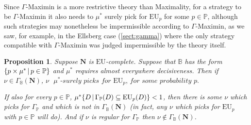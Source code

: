 \documentclass[a4paper]{article}
\newtheorem{proposition}[theorem]{Proposition}
\newcommand\N{\mathbf{N}}
\renewcommand\S{\mathcal{S}}
\renewcommand\P{\mathbb{P}} %
\newcommand\EU{\mathrm{EU}}
\newcommand\Maximin{\Gamma}
\newcommand{\IB}{\mathbb{B}}
\newcommand{\IP}{\P}
\renewcommand{\color}[1]{}
\newcommand\SetDelimiter[1][]{
	\nonscript\,#1\vert \allowbreak \nonscript\,\mathopen{}}
\providecommand\given{\SetDelimiter}
\newenvironment{CCM rewritten}
{\begingroup\color{blue}} %
{\endgroup}              %
\begin{document}
{\color{violet}Since $\Gamma$-Maximin is a more restrictive theory than Maximality, for a strategy to be $\Gamma$-Maximin it also needs to $\mu^*$ surely pick for $\EU_p$ for some $p\in\IP$, although such strategies may nonetheless be impermissible according to $\Gamma$-Maximin, as we saw, for example, in the Ellsberg case (\cref{sect:gamma}) where the only strategy compatible with $\Gamma$-Maximin was judged impermissible by the theory itself. 
	\begin{proposition}\label{thm:gamma-nu}Suppose $\N$ is $\EU$-complete. Suppose that 
		$\IB$ has the form $\{p\times \mu^*\given p\in \IP\}$ and $\mu^*$ requires almost everywhere decisiveness. Then if $\nu \in \Maximin_\IB(\N)$, $ \nu \textit{ $\mu^*$-surely picks for $\EU_p$, for some probability $p$.}$
		
		If also for every $p\in\IP$, $\mu^*\{D\given \Maximin_\IP(D)\subseteq \EU_p(D)\}<1$, then there is some $\nu$ which picks for $\Maximin_\IP$ and which is not in $\Maximin_\IB(\N)$ (in fact, any $\nu$ which picks for $\EU_p$ with $p\in\IP$ will do).  And if $\nu$ is regular for $\Maximin_\IP$ then $\nu\notin \Maximin_\IB(\N)$. 
	\end{proposition}
	
	
}

\end{document}
